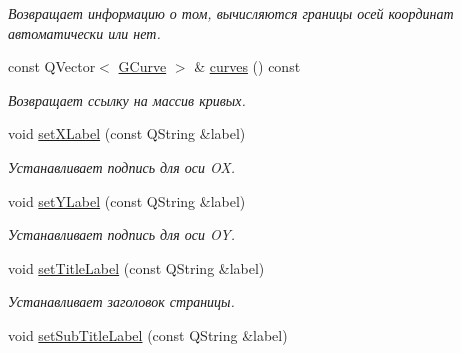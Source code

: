 \begin{DoxyCompactItemize}
\begin{DoxyCompactList}\small\item\em Возвращает информацию о том, вычисляются границы осей координат автоматически или нет. \end{DoxyCompactList}\item 
const Q\+Vector$<$ \hyperlink{struct_g_curve}{G\+Curve} $>$ \& \hyperlink{class_graph_sheet_a863720d302b57ea86e5f78fe23fe7a6b}{curves} () const \hypertarget{class_graph_sheet_a863720d302b57ea86e5f78fe23fe7a6b}{}\label{class_graph_sheet_a863720d302b57ea86e5f78fe23fe7a6b}

\begin{DoxyCompactList}\small\item\em Возвращает ссылку на массив кривых. \end{DoxyCompactList}\item 
void \hyperlink{class_graph_sheet_a621fe5716930326ee98375236b20522f}{set\+X\+Label} (const Q\+String \&label)\hypertarget{class_graph_sheet_a621fe5716930326ee98375236b20522f}{}\label{class_graph_sheet_a621fe5716930326ee98375236b20522f}

\begin{DoxyCompactList}\small\item\em Устанавливает подпись для оси OX. \end{DoxyCompactList}\item 
void \hyperlink{class_graph_sheet_a121f2bf52435af3924a5fe813456638e}{set\+Y\+Label} (const Q\+String \&label)\hypertarget{class_graph_sheet_a121f2bf52435af3924a5fe813456638e}{}\label{class_graph_sheet_a121f2bf52435af3924a5fe813456638e}

\begin{DoxyCompactList}\small\item\em Устанавливает подпись для оси OY. \end{DoxyCompactList}\item 
void \hyperlink{class_graph_sheet_abd3f11230cf41fa15df2c86ad630cbd0}{set\+Title\+Label} (const Q\+String \&label)\hypertarget{class_graph_sheet_abd3f11230cf41fa15df2c86ad630cbd0}{}\label{class_graph_sheet_abd3f11230cf41fa15df2c86ad630cbd0}

\begin{DoxyCompactList}\small\item\em Устанавливает заголовок страницы. \end{DoxyCompactList}\item 
void \hyperlink{class_graph_sheet_a0ecbf848f6d821e9fd5b6806c88a178c}{set\+Sub\+Title\+Label} (const Q\+String \&label)\hypertarget{class_graph_sheet_a0ecbf848f6d821e9fd5b6806c88a178c}{}\label{class_graph_sheet_a0ecbf848f6d821e9fd5b6806c88a178c}


\end{DoxyCompactItemize}
